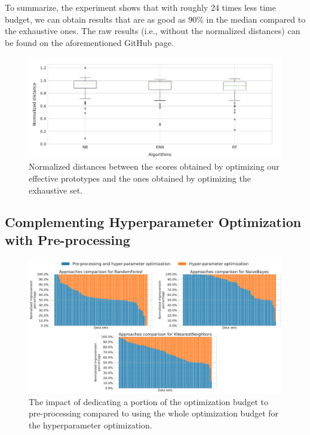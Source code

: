 To summarize, the experiment shows that with roughly 24 times less time budget, we can obtain results that are as good as 90\% in the median compared to the exhaustive ones.
The raw results (i.e., without the normalized distances) can be found on the aforementioned GitHub page.

\begin{figure}[!t]
    \centering
    \includegraphics[width=1.0\textwidth]{chapters/data-centric/supervised/img/evaluation2.pdf}
    \caption{Normalized distances between the scores obtained by optimizing our effective prototypes and the ones obtained by optimizing the exhaustive set.}
    \label{effective-fig:eval-exhaustive-vs-effective}
\end{figure}

\subsection{Complementing Hyperparameter Optimization with Pre-processing}
\label{effective-sec:eval-dpso-vs-cash}

\begin{figure}[!t]
	\centering
	\includegraphics[width=1.0\textwidth]{chapters/data-centric/supervised/img/barplot-10.pdf}
	\caption{The impact of dedicating a portion of the optimization budget to pre-processing compared to using the whole optimization budget for the hyperparameter optimization.}
	\label{effective-fig:eval-pre-processing-hyperparameter}
\end{figure}

